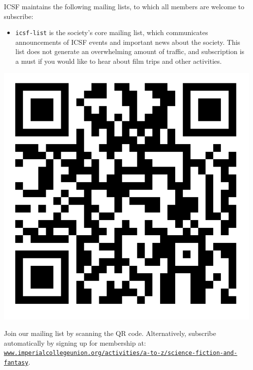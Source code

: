 

ICSF maintains the following mailing lists, to which all members are welcome to
subscribe:

\begin{itemize}
\item \texttt{icsf-list}
is the society’s core mailing list, which communicates announcements
of ICSF events and important news about the society. This list does
not generate an overwhelming amount of traffic, and subscription is a
must if you would like to hear about film trips and other activities.

\end{itemize}

\begin{minipage}[h]{7.8em}
\includegraphics[height=\textwidth]{img/info/qr-mailing-list.png}
\end{minipage}
\begin{minipage}[h]{0.85\linewidth}
\raggedright
Join our mailing list by scanning the QR code. Alternatively, subscribe automatically by signing up for membership at:\\\texttt{\url{www.imperialcollegeunion.org/activities/a-to-z/science-fiction-and-fantasy}}.
\end{minipage}

